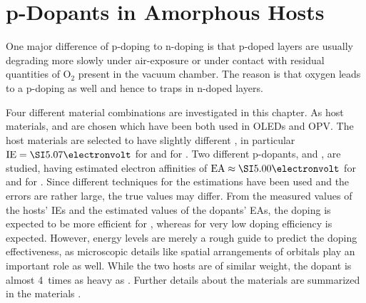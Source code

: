 \chapter{p-Dopants in Amorphous Hosts}\label{chap:P-Doping}


\pagebreak

One major difference of p-doping to n-doping is that p-doped layers are usually degrading more slowly under air-exposure or under contact with residual quantities of O$_2$ present in the vacuum chamber. The reason is that oxygen leads to a p-doping as well\cite{Hamed1993} and hence to traps in n-doped layers.

Four different material combinations are investigated in this chapter. As host materials, \meo and \lili are chosen which have been both used in OLEDs\cite{Reineke2009} and OPV\cite{Maennig2004,HermenauRiedeLeo2012}. The host materials are selected to have slightly different \IEs, in particular \mbox{$\text{IE}=\eV{5.07}$} for \meo\cite{Tietze2012} and  for \lili\cite{Meerheim2011}.
Two different p-dopants, \FS and \CSF, are studied, having estimated electron affinities of \mbox{$\text{EA}\approx\eV{5.00}$} for \FS\cite{Tietze2012,WellmannDiss} and  for \CSF\cite{Meerheim2011}. Since different techniques for the estimations have been used and the errors are rather large, the true values may differ.
From the measured values of the hosts' IEs and the estimated values of the dopants' EAs, the doping is expected to be more efficient for \CSF, whereas for \FS very low doping efficiency is expected.
However, energy levels are merely a rough guide to predict the doping effectiveness, as microscopic details like spatial arrangements of orbitals play an important role as well. While the two hosts are of similar weight, the dopant \CSF is almost 4~times as heavy as \FS.
Further details about the materials are summarized in the materials .

